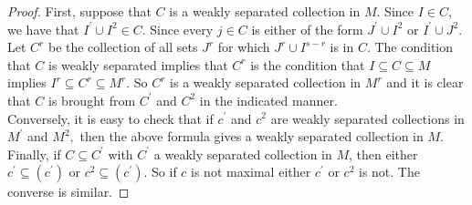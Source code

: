 \documentclass[12pt]{report}
\theoremstyle{theorem}
\begin{document}
\begin{proof}
First, suppose that $C$ is a weakly separated collection in $M$. Since $I\in C$, we have that $I^\prime\cup I^2\in C.$ Since every $j\in C$ is either of the form $J^\prime\cup I^2$ or $I^\prime\cup J^2$. Let $C^r$ be the collection of all sets $J^r$ for which $J^r\cup I^{s-r}$ is in $C$. The condition that $C$ is weakly separated implies that $C^r$ is the condition that $I\subseteq C\subseteq M$  implies $I^r\subseteq C^r\subseteq M^r$. So $C^r$ is a weakly separated collection in $M^r$ and it is clear that $C$ is brought from $C^\prime$ and $C^2$ in the indicated manner.\\
Conversely, it is easy to check that if $c^\prime$ and $c^2$ are weakly separated collections in $M^\prime$ and $M^2,$ then the above formula gives a weakly separated collection in $M$.\\
Finally, if $C\subseteq C^\prime$ with $C^\prime$ a weakly separated collection in $M$, then either $c^\prime\subseteq (c^\prime)$ or $c^2\subseteq(c^\prime)$. So if $c$ is not maximal either $c^\prime$ or $c^2$ is not.
The converse is similar.
\end{proof}
\end{document}
